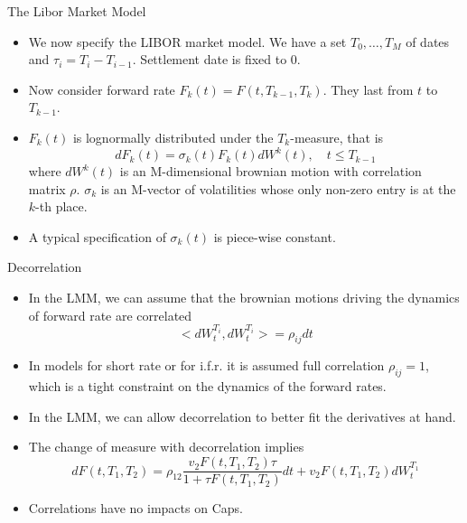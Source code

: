 \documentclass{beamer}
\begin{document}
\begin{frame}{The Libor Market Model}
\begin{itemize}
\item We now specify the LIBOR market model. We have a set $T_0,\ldots,T_M$ of dates and $\tau_i=T_i-T_{i-1}$. Settlement date is fixed to 0.
\item Now consider forward rate $F_k(t)=F(t,T_{k-1},T_k)$. They last from $t$ to $T_{k-1}$.
\item $F_k(t)$ is lognormally distributed under the $T_k$-measure, that is 
\begin{equation}
dF_k(t) = \sigma_k(t)F_k(t)dW^k(t),\quad t\leq T_{k-1}
\end{equation} 
where $dW^k(t)$ is an M-dimensional brownian motion with correlation matrix $\rho$. $\sigma_k$ is an M-vector of volatilities whose only non-zero entry is at the $k$-th place.
\item A typical specification of $\sigma_k(t)$ is piece-wise constant.
\end{itemize}
\end{frame}



\begin{frame}{Decorrelation}
\begin{itemize}
	\item In the LMM, we can assume that the brownian motions driving the dynamics of forward rate are correlated
	\begin{equation}
	<dW_t^{T_i}, dW_t^{T_i}> = \rho_{ij}dt
	\end{equation}
\item In models for short rate or for i.f.r. it is assumed full correlation $\rho_{ij}=1$, which is a tight constraint on the dynamics of the forward rates.
\item In the LMM, we can allow decorrelation to better fit the derivatives at hand.
\item The change of measure with decorrelation implies
\begin{equation}
dF(t,T_1,T_2)=\rho_{12}\frac{v_2F(t,T_1,T_2)\tau}{1+\tau F(t,T_1,T_2)}dt + v_2F(t,T_1,T_2)dW^{T_1}_t
\end{equation}
\item Correlations have no impacts on Caps.
\end{itemize}
\end{frame}
\end{document}
